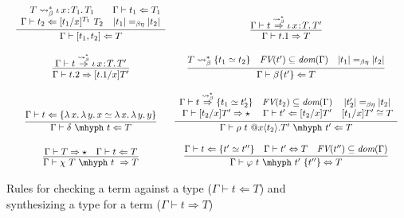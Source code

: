 \documentclass{article}
\newcommand{\abs}[4]{{#1}\, #2\! : \! #3.\, #4}
\newcommand{\absu}[3]{{#1}\, #2.\, #3}
\newcommand{\tpcheck}[0]{\Leftarrow}
\newcommand{\tpsynth}[0]{\Rightarrow}
\newcommand{\tpsynthleads}[0]{\ensuremath{\overset{\leadsto_\beta^*}{\Rightarrow}}}
\begin{document}
\begin{figure}
\[\begin{array}{c}
\begin{array}{cc}
    \infer{\Gamma\vdash [ t_1 , t_2 ] \tpcheck T}
          {
           \begin{array}{cc}
             T \leadsto_\beta^* \abs{\iota}{x}{T_1}{T_1}
             & \Gamma \vdash t_1 \tpcheck T_1
             \\ \Gamma \vdash t_2 \tpcheck [t_1/x]^{T_1}\ T_2
             & |t_1| =_{\beta\eta} |t_2|
           \end{array}
          } &
    \infer{\Gamma\vdash t.1 \tpsynth T}{\Gamma\vdash t \tpsynthleads \abs{\iota}{x}{T}{T'}} \\ \\
    \infer{\Gamma\vdash t.2 \tpsynth [t.1/x] T'}{\Gamma\vdash t \tpsynthleads \abs{\iota}{x}{T}{T'}} &
    \infer{\Gamma\vdash \beta\{t'\} \tpcheck T}
          {T \leadsto_\beta^* \{t_1 \simeq t_2\} \quad \textit{FV}(t')\subseteq \textit{dom}(\Gamma) \quad |t_1| =_{\beta\eta} |t_2|}  \\ \\    
    \infer{\Gamma\vdash \delta\ \mhyph\ t \tpcheck T}
          {\Gamma\vdash t\tpcheck \{\absu{\lambda}{x}{\absu{\lambda}{y}{x}} \simeq \absu{\lambda}{x}{\absu{\lambda}{y}{y}}\}} &
    \infer{\Gamma \vdash \rho\ t\ @x\langle t_2 \rangle.T'\ \mhyph\ t' \tpcheck T}
          {
          \begin{array}{ccc}
            \Gamma \vdash t \tpsynthleads \{t_1 \simeq t_2'\}
            & \textit{FV}(t_2) \subseteq \textit{dom}(\Gamma)
            & |t_2'| =_{\beta\eta} |t_2|
            \\ \Gamma \vdash [t_2/x] T' \tpsynth \star
            & \Gamma \vdash t' \tpcheck [t_2/x]T'
            & [t_1/x]T' \cong T
          \end{array}
          } \\ \\
    \infer{\Gamma \vdash \chi\ T\ \mhyph\ t\ \tpsynth T}
          {\Gamma \vdash T \tpsynth \star & \Gamma \vdash t \tpcheck T} &
    \infer{\Gamma\vdash \varphi\ t\ \mhyph\ t'\ \{t''\} \Leftrightarrow T}
          {
              \Gamma\vdash t\tpcheck \{t' \simeq t''\}
              & \Gamma\vdash t' \Leftrightarrow T
              & \textit{FV}(t'') \subseteq \textit{dom}(\Gamma)
          }
  \end{array}
    \end{array}
  \]
\caption{Rules for checking a term against a type ($\Gamma \vdash t \tpcheck T$)
           and synthesizing a type for a term ($\Gamma \vdash t \tpsynth T$)}
\label{fig:tp}
\end{figure}
\end{document}
